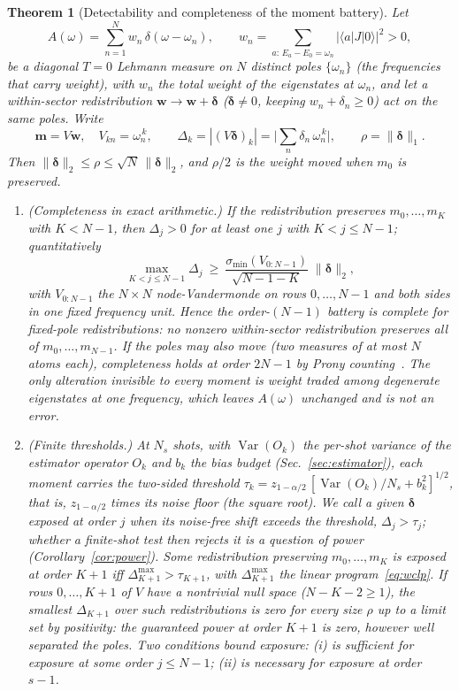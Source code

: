\documentclass[submission, PhysCore]{SciPost}
\newtheorem{theorem}{Theorem}
\begin{document}
\begin{theorem}[Detectability and completeness of the moment battery]
\label{thm:detect}\sloppy
Let
\[
A(\omega)=\sum_{n=1}^{N}w_n\,\delta(\omega-\omega_n),\qquad w_n=\sum_{a:\,E_a-E_0=\omega_n}|\langle a|J|0\rangle|^2>0,
\]
be a diagonal $T=0$ Lehmann measure on $N$ \emph{distinct} poles $\{\omega_n\}$ (the frequencies that carry weight), with $w_n$ the total weight of the eigenstates at $\omega_n$, and let a within-sector redistribution $\mathbf{w}\to\mathbf{w}+\bm{\delta}$ ($\bm{\delta}\neq0$, keeping $w_n+\delta_n\ge0$) act on the \emph{same} poles. Write
\[
\mathbf{m}=V\mathbf{w},\quad V_{kn}=\omega_n^{\,k},\qquad \Delta_k=|(V\bm{\delta})_k|=\Big|\sum_n\delta_n\,\omega_n^{\,k}\Big|,\qquad \rho=\|\bm{\delta}\|_1 .
\]
Then $\|\bm{\delta}\|_2\le\rho\le\sqrt{N}\,\|\bm{\delta}\|_2$, and $\rho/2$ is the weight moved when $m_0$ is preserved.
\begin{enumerate}
\item[(a)] \emph{(Completeness in exact arithmetic.)} If the redistribution preserves $m_0,\dots,m_K$ with ${K<N-1}$, then $\Delta_j>0$ for at least one $j$ with ${K<j\le N-1}$; quantitatively
\begin{equation}
\max_{K<j\le N-1}\Delta_j\ \ge\ \frac{\sigma_{\min}(V_{0:N-1})}{\sqrt{N-1-K}}\;\|\bm{\delta}\|_2,
\label{eq:detect-sigmamin}
\end{equation}
with $V_{0:N-1}$ the $N\times N$ node-Vandermonde on rows $0,\dots,N-1$ and both sides in one fixed frequency unit. Hence the order-$(N{-}1)$ battery is \emph{complete} for fixed-pole redistributions: no nonzero within-sector redistribution preserves all of $m_0,\dots,m_{N-1}$. If the poles may also move (two measures of at most $N$ atoms each), completeness holds at order $2N-1$ by Prony counting~\cite{ShohatTamarkin1943,PottsTasche2013}. The only alteration invisible to every moment is weight traded among degenerate eigenstates at one frequency, which leaves $A(\omega)$ unchanged and is not an error.
\item[(b)] \emph{(Finite thresholds.)} At $N_s$ shots, with $\operatorname{Var}(O_k)$ the per-shot variance of the estimator operator $O_k$ and $b_k$ the bias budget (Sec.~\ref{sec:estimator}), each moment carries the two-sided threshold $\tau_k=z_{1-\alpha/2}\,[\operatorname{Var}(O_k)/N_s+b_k^2]^{1/2}$, that is, $z_{1-\alpha/2}$ times its noise floor (the square root). We call a given $\bm{\delta}$ \emph{exposed} at order $j$ when its noise-free shift exceeds the threshold, $\Delta_j>\tau_j$; whether a finite-shot test then rejects it is a question of power (Corollary~\ref{cor:power}). Some redistribution preserving $m_0,\dots,m_K$ is exposed at order $K{+}1$ iff $\Delta_{K+1}^{\max}>\tau_{K+1}$, with $\Delta_{K+1}^{\max}$ the linear program~\eqref{eq:wclp}. If rows $0,\dots,K{+}1$ of $V$ have a nontrivial null space (${N-K-2\ge1}$), the smallest $\Delta_{K+1}$ over such redistributions is zero for every size $\rho$ up to a limit set by positivity: the guaranteed power at order $K{+}1$ is zero, however well separated the poles. Two conditions bound exposure: (i) is sufficient for exposure at some order $j\le N-1$; (ii) is necessary for exposure at order $s-1$.

\end{enumerate}
\end{theorem}
\end{document}
